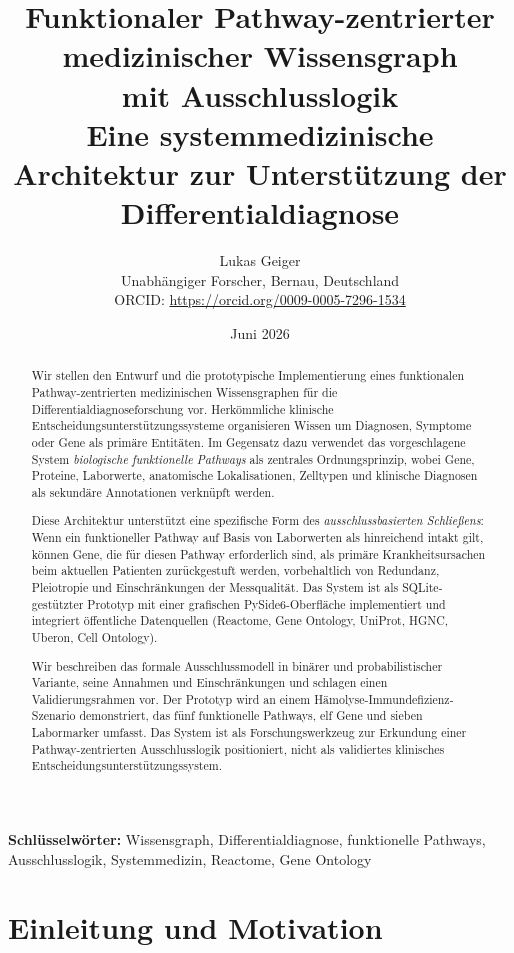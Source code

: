 \documentclass[12pt,a4paper]{article}
\title{%
    \textbf{Funktionaler Pathway-zentrierter medizinischer Wissensgraph\\
    mit Ausschlusslogik}\\[0.5em]
    \large Eine systemmedizinische Architektur zur Unterstützung der Differentialdiagnose
}
\author{
    Lukas Geiger\\
    Unabhängiger Forscher, Bernau, Deutschland\\
    ORCID: \url{https://orcid.org/0009-0005-7296-1534}
}
\date{Juni 2026}
\begin{document}
\maketitle

\begin{abstract}
Wir stellen den Entwurf und die prototypische Implementierung eines funktionalen Pathway-zentrierten medizinischen Wissensgraphen für die Differentialdiagnoseforschung vor. Herkömmliche klinische Entscheidungsunterstützungssysteme organisieren Wissen um Diagnosen, Symptome oder Gene als primäre Entitäten. Im Gegensatz dazu verwendet das vorgeschlagene System \emph{biologische funktionelle Pathways} als zentrales Ordnungsprinzip, wobei Gene, Proteine, Laborwerte, anatomische Lokalisationen, Zelltypen und klinische Diagnosen als sekundäre Annotationen verknüpft werden.

Diese Architektur unterstützt eine spezifische Form des \emph{ausschlussbasierten Schließens}: Wenn ein funktioneller Pathway auf Basis von Laborwerten als hinreichend intakt gilt, können Gene, die für diesen Pathway erforderlich sind, als primäre Krankheitsursachen beim aktuellen Patienten zurückgestuft werden, vorbehaltlich von Redundanz, Pleiotropie und Einschränkungen der Messqualität. Das System ist als SQLite-gestützter Prototyp mit einer grafischen PySide6-Oberfläche implementiert und integriert öffentliche Datenquellen (Reactome, Gene Ontology, UniProt, HGNC, Uberon, Cell Ontology).

Wir beschreiben das formale Ausschlussmodell in binärer und probabilistischer Variante, seine Annahmen und Einschränkungen und schlagen einen Validierungsrahmen vor. Der Prototyp wird an einem Hämolyse-Immundefizienz-Szenario demonstriert, das fünf funktionelle Pathways, elf Gene und sieben Labormarker umfasst. Das System ist als Forschungswerkzeug zur Erkundung einer Pathway-zentrierten Ausschlusslogik positioniert, nicht als validiertes klinisches Entscheidungsunterstützungssystem.
\end{abstract}

\smallskip
\noindent\textbf{Schlüsselwörter:} Wissensgraph, Differentialdiagnose, funktionelle Pathways, Ausschlusslogik, Systemmedizin, Reactome, Gene Ontology
\clearpage

\section{Einleitung und Motivation}
\label{sec:introduction}
\end{document}
